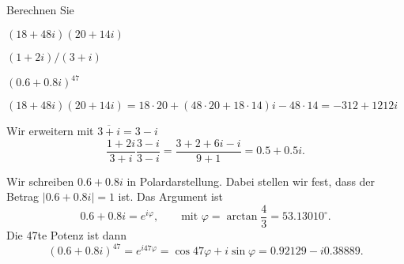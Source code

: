 Berechnen Sie
\begin{teilaufgaben}
\item
$(18 + 48i)(20 + 14i)$
\item
$(1+2i)/(3+i)$
\item
$(0.6 + 0.8i)^{47}$
\end{teilaufgaben}

\begin{loesung}
\begin{teilaufgaben}
\item 
$
(18 + 48i)(20 + 14i)
=
18\cdot 20 + (48\cdot 20+18\cdot 14)i-48\cdot 14
=
-312+1212i$
\item Wir erweitern mit $\overline{3+i}=3-i$
\[
\frac{1+2i}{3+i}\frac{3-i}{3-i}
=
\frac{3+2+6i-i}{9+1}
=
0.5+0.5i.
\]
\item
Wir schreiben $0.6+0.8i$ in Polardarstellung.
Dabei stellen wir fest, dass der Betrag $|0.6+0.8i|=1$ ist. Das Argument ist
\[
0.6+0.8i=
e^{i\varphi},\qquad\text{mit $\varphi=\arctan\frac43=53.13010^\circ$}.
\]
Die 47te Potenz ist dann
\[
(0.6+0.8i)^{47}=e^{i47\varphi}
=\cos 47\varphi+i\sin\varphi
=0.92129 - i0.38889.
\]
\end{teilaufgaben}
\end{loesung}


